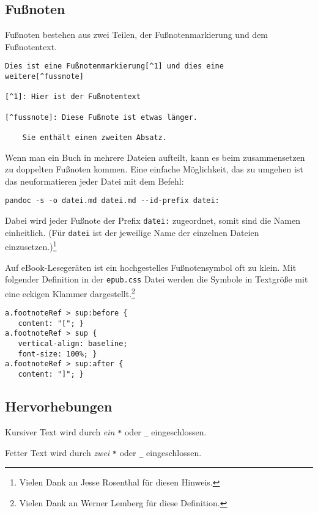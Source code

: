 \documentclass[11pt,ngerman,a4paper]{article}
\begin{document}
\subsection{Fußnoten}\label{fuuxdfnoten}

Fußnoten bestehen aus zwei Teilen, der Fußnotenmarkierung und dem
Fußnotentext.

\begin{verbatim}
Dies ist eine Fußnotenmarkierung[^1] und dies eine 
weitere[^fussnote]

[^1]: Hier ist der Fußnotentext

[^fussnote]: Diese Fußnote ist etwas länger.

    Sie enthält einen zweiten Absatz.
\end{verbatim}

Wenn man ein Buch in mehrere Dateien aufteilt, kann es beim
zusammensetzen zu doppelten Fußnoten kommen. Eine einfache Möglichkeit,
das zu umgehen ist das neuformatieren jeder Datei mit dem Befehl:

\begin{verbatim}
pandoc -s -o datei.md datei.md --id-prefix datei:
\end{verbatim}

Dabei wird jeder Fußnote der Prefix \texttt{datei:} zugeordnet, somit
sind die Namen einheitlich. (Für \texttt{datei} ist der jeweilige Name
der einzelnen Dateien einzusetzen.)\footnote{Vielen Dank an Jesse
  Rosenthal für diesen Hinweis.}

Auf eBook-Lesegeräten ist ein hochgestelles Fußnotensymbol oft zu klein.
Mit folgender Definition in der \texttt{epub.css} Datei werden die
Symbole in Textgröße mit eine eckigen Klammer dargestellt.\footnote{Vielen
  Dank an Werner Lemberg für diese Definition.}

\begin{verbatim}
a.footnoteRef > sup:before {
   content: "["; }
a.footnoteRef > sup {
   vertical-align: baseline;
   font-size: 100%; }
a.footnoteRef > sup:after {
   content: "]"; }
\end{verbatim}

\subsection{Hervorhebungen}\label{hervorhebungen}

Kursiver Text wird durch \emph{ein} \texttt{*} oder \texttt{\_}
eingeschlossen.

Fetter Text wird durch \emph{zwei} \texttt{*} oder \texttt{\_}
eingeschlossen.
\end{document}
